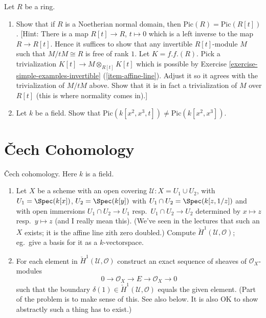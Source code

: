\begin{exercise}
\label{exercise-traverso}
Let $R$ be a ring.
\begin{enumerate}
\item Show that if $R$ is a Noetherian normal domain, then
$\text{Pic}(R) = \text{Pic}(R[t])$. [Hint: There is a map
$R[t] \to R$, $t \mapsto 0$ which is a left inverse to the map
$R \to R[t]$. Hence it suffices to show that any invertible
$R[t]$-module $M$ such that $M/tM \cong R$ is free of rank $1$.
Let $K = f.f.(R)$.
Pick a trivialization $K[t] \to M \otimes_{R[t]} K[t]$ which is possible by
Exercise \ref{exercise-simple-examples-invertible} (\ref{item-affine-line}).
Adjust it so it agrees with the trivialization
of $M/tM$ above. Show that it is in fact a trivialization of
$M$ over $R[t]$ (this is where normality comes in).]
\item Let $k$ be a field. Show that
$\text{Pic}(k[x^2, x^3, t]) \not = \text{Pic}(k[x^2, x^3])$.
\end{enumerate}
\end{exercise}













\section{{\v C}ech Cohomology}
\label{section-cech-cohomology}

\begin{exercise}
\label{exercise-cech-cohomology}
{\v C}ech cohomology. Here $k$ is a field.
\begin{enumerate}
\item Let $X$ be a scheme with an open covering
${\mathcal U} : X = U_1 \cup U_2$, with $U_1 = \Spec(k[x])$,
$U_2 =  \Spec(k[y])$
with $U_1 \cap U_2 = \Spec(k[z, 1/z])$ and with open immersions
$U_1 \cap U_2 \to U_1$ resp.\ $U_1 \cap U_2 \to U_2$ determined
by $x \mapsto z$ resp.\ $y \mapsto z$ (and I really mean this).
(We've seen in the lectures that such an $X$ exists; it is the affine
line zith zero doubled.) Compute ${\check H}^1({\mathcal U}, {\mathcal
O})$;
eg.\ give a basis for it as a $k$-vectorspace.
\item For each element in
${\check H}^1({\mathcal U}, {\mathcal O})$
construct an exact sequence of sheaves of ${\mathcal O}_X$-modules
$$
0 \to {\mathcal O}_X \to E \to {\mathcal O}_X \to 0
$$
such that the boundary $\delta(1) \in {\check H}^1({\mathcal U},
{\mathcal O})$
equals the given element. (Part of the problem is to make sense of this.
See also below.
It is also OK to show abstractly such a thing has to exist.)
\end{enumerate}
\end{exercise}

